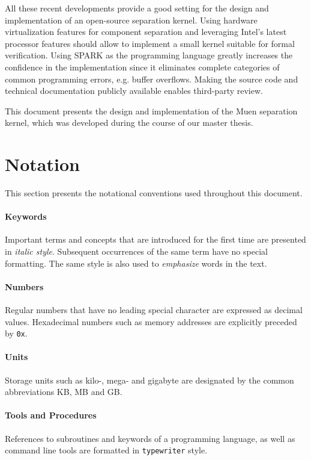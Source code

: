 All these recent developments provide a good setting for the design and
implementation of an open-source separation kernel. Using hardware
virtualization features for component separation and leveraging Intel's latest
processor features should allow to implement a small kernel suitable for formal
verification. Using SPARK as the programming language greatly increases the
confidence in the implementation since it eliminates complete categories of
common programming errors, e.g. buffer overflows. Making the source code and
technical documentation publicly available enables third-party review.

This document presents the design and implementation of the Muen separation
kernel, which was developed during the course of our master thesis.

\section{Notation}
This section presents the notational conventions used throughout this document.

\paragraph{Keywords}
Important terms and concepts that are introduced for the first time are
presented in \emph{italic style}. Subsequent occurrences of the same term have
no special formatting. The same style is also used to \emph{emphasize} words in
the text.

\paragraph{Numbers}
Regular numbers that have no leading special character are expressed as decimal
values. Hexadecimal numbers such as memory addresses are explicitly preceded by
\texttt{0x}.

\paragraph{Units}
Storage units such as kilo-, mega- and gigabyte are designated by
the common abbreviations KB, MB and GB.

\paragraph{Tools and Procedures}
References to subroutines and keywords of a programming language, as well as
command line tools are formatted in \texttt{typewriter} style.

